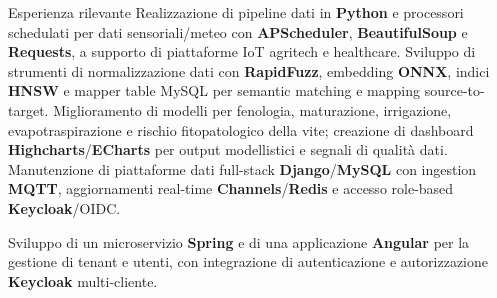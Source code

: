 \begin{rubric}{Esperienza rilevante}
\entry*%
 Realizzazione di pipeline dati in \textbf{Python} e processori schedulati per dati sensoriali/meteo con \textbf{APScheduler}, \textbf{BeautifulSoup} e \textbf{Requests}, a supporto di piattaforme IoT agritech e healthcare.
\entry*%
 Sviluppo di strumenti di normalizzazione dati con \textbf{RapidFuzz}, embedding \textbf{ONNX}, indici \textbf{HNSW} e mapper table MySQL per semantic matching e mapping source-to-target.
\entry*%
 Miglioramento di modelli per fenologia, maturazione, irrigazione, evapotraspirazione e rischio fitopatologico della vite; creazione di dashboard \textbf{Highcharts}/\textbf{ECharts} per output modellistici e segnali di qualit\`a dati.
\entry*%
 Manutenzione di piattaforme dati full-stack \textbf{Django}/\textbf{MySQL} con ingestion \textbf{MQTT}, aggiornamenti real-time \textbf{Channels}/\textbf{Redis} e accesso role-based \textbf{Keycloak}/OIDC.

%
\entry*%
 Sviluppo di un microservizio \textbf{Spring} e di una applicazione \textbf{Angular} per la gestione di tenant e utenti, con integrazione di autenticazione e autorizzazione \textbf{Keycloak} multi-cliente.
%
\end{rubric}
